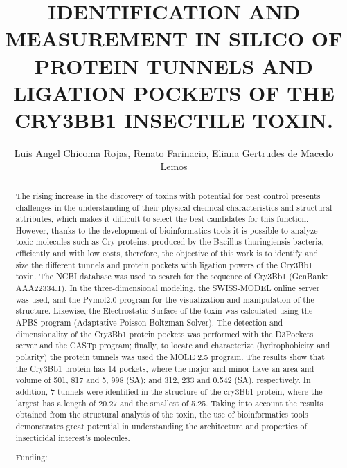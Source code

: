 \documentclass[twoside]{article}
\title{\vspace{-15mm}\fontsize{24pt}{10pt}\selectfont\textbf{ IDENTIFICATION AND MEASUREMENT IN SILICO OF PROTEIN TUNNELS AND LIGATION POCKETS OF THE CRY3BB1 INSECTILE TOXIN. }} %
\author{ Luis Angel Chicoma Rojas, Renato Farinacio, Eliana Gertrudes de Macedo Lemos }
\affil{ Private University Antenor Orrego \& Paulista State University,  Jaboticabal Campus }
\date{}
\begin{document}
  
  
  \maketitle %
  
  
  \thispagestyle{fancy} %
  
  
  \begin{abstract}
  The rising increase in the discovery of toxins with potential for pest control presents challenges in the understanding of their physical-chemical characteristics and structural attributes,  which makes it difficult to select the best candidates for this function. However,  thanks to the development of bioinformatics tools it is possible to analyze toxic molecules such as Cry proteins,  produced by the Bacillus thuringiensis bacteria,  efficiently and with low costs,  therefore,  the objective of this work is to identify and size the different tunnels and protein pockets with ligation powers of the Cry3Bb1 toxin. The NCBI database was used to search for the sequence of Cry3Bb1 (GenBank: AAA22334.1). In the three-dimensional modeling,  the SWISS-MODEL online server was used,  and the Pymol2.0 program for the visualization and manipulation of the structure. Likewise,  the Electrostatic Surface of the toxin was calculated using the APBS program (Adaptative Poisson-Boltzman Solver). The detection and dimensionality of the Cry3Bb1 protein pockets was performed with the D3Pockets server and the CASTp program; finally,  to locate and characterize (hydrophobicity and polarity) the protein tunnels was used the MOLE 2.5 program. The results show that the Cry3Bb1 protein has 14 pockets,  where the major and minor have an area and volume of 501, 817 and 5, 998 (SA); and 312, 233 and 0.542 (SA),  respectively. In addition,  7 tunnels were identified in the structure of the cry3Bb1 protein,  where the largest has a length of 20.27 and the smallest of 5.25. Taking into account the results obtained from the structural analysis of the toxin,  the use of bioinformatics tools demonstrates great potential in understanding the architecture and properties of insecticidal interest’s molecules.
  
  Funding:  \\ 
  \end{abstract}
  
\end{document}
